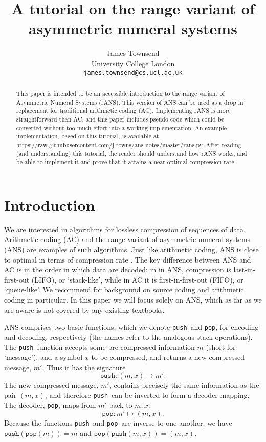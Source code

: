 \documentclass{article}
\author{
  James Townsend\\
  University College London\\
  \texttt{james.townsend@cs.ucl.ac.uk}
}
\title{A tutorial on the range variant of asymmetric numeral systems}
\theoremstyle{definition}
\newcommand{\push}{\texttt{push}}
\newcommand{\pop}{\texttt{pop}}
\begin{document}
\maketitle
\begin{abstract}
This paper is intended to be an accessible introduction to the range variant of
Asymmetric Numeral Systems (rANS). This version of ANS can be used as a drop in
replacement for traditional arithmetic coding (AC). Implementing rANS is more
straightforward than AC, and this paper includes pseudo-code which could be
converted without too much effort into a working implementation. An example
implementation, based on this tutorial, is available at
\url{https://raw.githubusercontent.com/j-towns/ans-notes/master/rans.py}. After
reading (and understanding) this tutorial, the reader should understand how
rANS works, and be able to implement it and prove that it attains a near
optimal compression rate.
\end{abstract}
\section{Introduction}
We are interested in algorithms for lossless compression of sequences of data.
Arithmetic coding (AC) and the range variant of asymmetric numeral systems
(ANS) are examples of such algorithms. Just like arithmetic coding, ANS is
close to optimal in terms of compression rate \citep{witten1987, duda2009}. The
key difference between ANS and AC is in the order in which data are decoded: in
in ANS, compression is last-in-first-out (LIFO), or `stack-like', while in AC
it is first-in-first-out (FIFO), or `queue-like'. We recommend
\cite[Chapter~4-6]{mackay2003} for background on source coding and arithmetic
coding in particular. In this paper we will focus solely on ANS, which as far
as we are aware is not covered by any existing textbooks.

ANS comprises two basic functions, which we denote \push\ and \pop, for
encoding and decoding, respectively (the names refer to the analogous stack
operations). The \push\ function accepts some pre-compressed information \(m\)
(short for `message'), and a symbol \(x\) to be compressed, and returns a new
compressed message, \(m'\). Thus it has the signature
\begin{equation}
  \push:(m, x) \mapsto m'.
\end{equation}
The new compressed message, \(m'\), contains precisely the same information as
the pair \((m, x)\), and therefore \push\ can be inverted to form a decoder
mapping.  The decoder, \pop, maps from \(m'\) back to \(m, x\):
\begin{equation}
  \pop:m' \mapsto (m, x).
\end{equation}
Because the functions \push\ and \pop\ are inverse to one another, we have
\(\push(\pop(m))=m\) and \(\pop(\push(m, x)) = (m, x)\).
\end{document}
